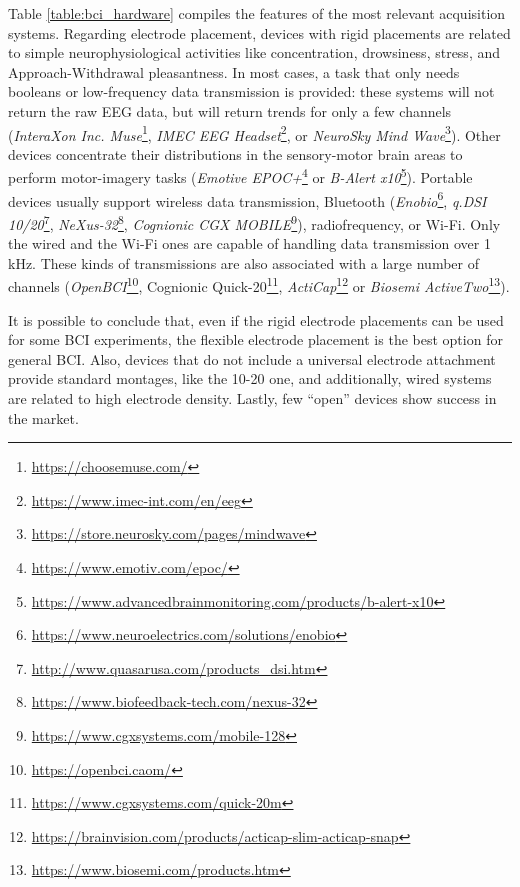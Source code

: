 Table \ref{table:bci_hardware} compiles the features of the most relevant acquisition systems. Regarding electrode placement, devices with rigid placements are related to simple neurophysiological activities like concentration, drowsiness, stress, and Approach-Withdrawal pleasantness. In most cases, a task that only needs booleans or low-frequency data transmission is provided: these systems will not return the raw \gls*{EEG} data, but will return trends for only a few channels (\textit{InteraXon Inc. Muse}\footnote{\href{https://choosemuse.com/}{https://choosemuse.com/}}, \textit{IMEC EEG Headset}\footnote{\href{https://www.imec-int.com/en/eeg}{https://www.imec-int.com/en/eeg}}, or \textit{NeuroSky Mind Wave}\footnote{\href{https://store.neurosky.com/pages/mindwave}{https://store.neurosky.com/pages/mindwave}}). Other devices concentrate their distributions in the sensory-motor brain areas to perform motor-imagery tasks (\textit{Emotive EPOC+}\footnote{\href{https://www.emotiv.com/epoc/}{https://www.emotiv.com/epoc/}} or \textit{B-Alert x10}\footnote{\href{https://www.advancedbrainmonitoring.com/products/b-alert-x10}{https://www.advancedbrainmonitoring.com/products/b-alert-x10}}). Portable devices usually support wireless data transmission, Bluetooth  (\textit{Enobio}\footnote{\href{https://www.neuroelectrics.com/solutions/enobio}{https://www.neuroelectrics.com/solutions/enobio}}, \textit{q.DSI 10/20}\footnote{\href{http://www.quasarusa.com/products_dsi.htm}{http://www.quasarusa.com/products_dsi.htm}}, \textit{NeXus-32}\footnote{\href{https://www.biofeedback-tech.com/nexus-32}{https://www.biofeedback-tech.com/nexus-32}}, \textit{Cognionic CGX MOBILE}\footnote{\href{https://www.cgxsystems.com/mobile-128}{https://www.cgxsystems.com/mobile-128}}), radiofrequency, or Wi-Fi. Only the wired and the Wi-Fi ones are capable of handling data transmission over 1 kHz. These kinds of transmissions are also associated with a large number of channels (\textit{OpenBCI}\footnote{\href{https://openbci.caom/}{https://openbci.caom/}}, Cognionic Quick-20\footnote{\href{https://www.cgxsystems.com/quick-20m}{https://www.cgxsystems.com/quick-20m}}, \textit{ActiCap}\footnote{\href{https://brainvision.com/products/acticap-slim-acticap-snap}{https://brainvision.com/products/acticap-slim-acticap-snap}} or \textit{Biosemi ActiveTwo}\footnote{\href{https://www.biosemi.com/products.htm}{https://www.biosemi.com/products.htm}}). 

It is possible to conclude that, even if the rigid electrode placements can be used for some \gls*{BCI} experiments, the flexible electrode placement is the best option for general \gls*{BCI}. Also, devices that do not include a universal electrode attachment provide standard montages, like the 10-20 one, and additionally, wired systems are related to high electrode density. Lastly, few “open” devices show success in the market.

